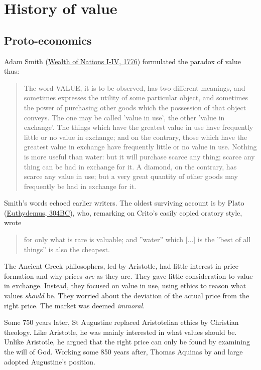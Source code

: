 \chapter{History of value}
\label{ch:histvalue}

\section{Proto-economics}
Adam Smith (\href{https://www.econlib.org/library/Smith/smWN.html?chapter_num=7#book-reader}{Wealth of Nations I-IV, 1776}) formulated the paradox of value thus:
\begin{quote}
    The word VALUE, it is to be observed, has two different meanings, and sometimes expresses the utility of some particular object, and sometimes the power of purchasing other goods which the possession of that object conveys. The one may be called 'value in use', the other 'value in exchange'. The things which have the greatest value in use have frequently little or no value in exchange; and on the contrary, those which have the greatest value in exchange have frequently little or no value in use. Nothing is more useful than water: but it will purchase scarce any thing; scarce any thing can be had in exchange for it. A diamond, on the contrary, has scarce any value in use; but a very great quantity of other goods may frequently be had in exchange for it.
\end{quote}
Smith's words echoed earlier writers. The oldest surviving account is by Plato (\href{http://classics.mit.edu/Plato/euthydemus.1b.txt}{Euthydemus, 304BC}), who, remarking on Crito's easily copied oratory style, wrote
\begin{quote}
for only what is rare is valuable; and ''water'' which [...] is the ''best of all things'' is also the cheapest.
\end{quote}

The Ancient Greek philosophers, led by Aristotle, had little interest in price formation and why prices \emph{are} as they are. They gave little consideration to value in exchange. Instead, they focused on value in use, using ethics to reason what values \emph{should} be. They worried about the deviation of the actual price from the right price. The market was deemed \emph{immoral}.

Some 750 years later, St Augustine replaced Aristotelian ethics by Christian theology. Like Aristotle, he was mainly interested in what values should be. Unlike Aristotle, he argued that the right price can only be found by examining the will of God. Working some 850 years after, Thomas Aquinas by and large adopted Augustine's position.

